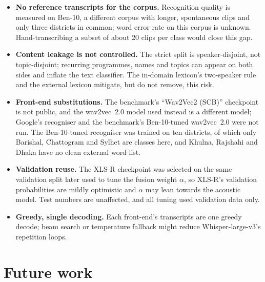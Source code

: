 \begin{itemize}
  \item \textbf{No reference transcripts for the corpus.} Recognition quality is
        measured on Ben-10, a different corpus with longer, spontaneous clips
        and only three districts in common; word error rate on this corpus is
        unknown. Hand-transcribing a subset of about 20 clips per class would
        close this gap.
  \item \textbf{Content leakage is not controlled.} The strict split is
        speaker-disjoint, not topic-disjoint; recurring programmes, names and
        topics can appear on both sides and inflate the text classifier. The
        in-domain lexicon's two-speaker rule and the external lexicon mitigate,
        but do not remove, this risk.
  \item \textbf{Front-end substitutions.} The benchmark's ``Wav2Vec2 (SCB)''
        checkpoint is not public, and the wav2vec~2.0 model used instead is a
        different model; Google's recogniser and the benchmark's Ben-10-tuned
        wav2vec~2.0 were not run. The Ben-10-tuned recogniser was trained on ten
        districts, of which only Barishal, Chattogram and Sylhet are classes
        here, and Khulna, Rajshahi and Dhaka have no clean external word list.
  \item \textbf{Validation reuse.} The XLS-R checkpoint was selected on the same
        validation split later used to tune the fusion weight $\alpha$, so
        XLS-R's validation probabilities are mildly optimistic and $\alpha$ may
        lean towards the acoustic model. Test numbers are unaffected, and all
        tuning used validation data only.
  \item \textbf{Greedy, single decoding.} Each front-end's transcripts are one
        greedy decode; beam search or temperature fallback might reduce
        Whisper-large-v3's repetition loops.
\end{itemize}

\section{Future work}
\label{sec:disc-future}

